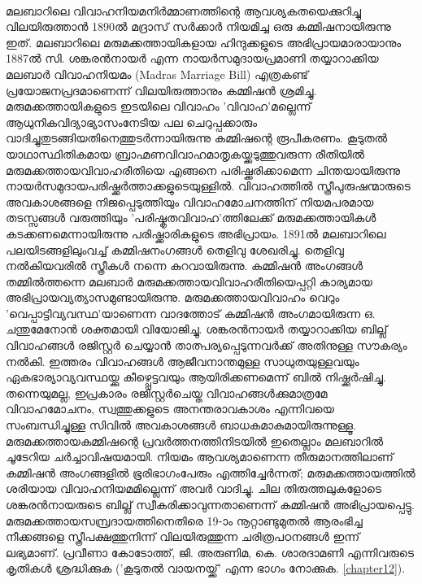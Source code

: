 \label{ch5box2} %
\begin{tcolorbox}[%
 breakable, %
  arc=0mm, 
  left=1pt, right = 1pt, 
  boxrule=0mm,
  colback = {blue!10}, %
] 

\paragraph{}മലബാറിലെ വിവാഹനിയമനിർമ്മാണത്തിന്റെ ആവശ്യകതയെക്കുറിച്ചു വിലയിരുത്താൻ 1890ൽ മദ്രാസ് സർക്കാർ നിയമിച്ച ഒരു കമ്മിഷനായിരുന്നു ഇത്. മലബാറിലെ മരുമക്കത്തായികളായ ഹിന്ദുക്കളുടെ അഭിപ്രായമാരായാനും 1887ൽ സി. ശങ്കരൻനായർ എന്ന നായർസമുദായപ്രമാണി തയ്യാറാക്കിയ മലബാർ വിവാഹനിയമം (Madras Marriage Bill) എത്രകണ്ട് പ്രയോജനപ്രദമാണെന്ന് വിലയിരുത്താനും കമ്മിഷൻ ശ്രമിച്ചു. മരുമക്കത്തായികളുടെ ഇടയിലെ വിവാഹം 'വിവാഹ'മല്ലെന്ന് ആധുനികവിദ്യാഭ്യാസംനേടിയ പല ചെറുപ്പക്കാരും വാദിച്ചുതുടങ്ങിയതിനെത്തുടർന്നായിരുന്നു കമ്മിഷന്റെ രൂപീകരണം. കൂടുതൽ യാഥാസ്ഥിതികമായ ബ്രാഹ്മണവിവാഹമാതൃകയ്ക്കടുത്തുവരുന്ന രീതിയിൽ മരുമക്കത്തായവിവാഹരീതിയെ എങ്ങനെ പരിഷ്ക്കരിക്കാമെന്ന ചിന്തയായിരുന്നു നായർസമുദായപരിഷ്ക്കർത്താക്കളുടെയുള്ളിൽ. വിവാഹത്തിൽ സ്ത്രീപുരുഷന്മാരുടെ അവകാശങ്ങളെ നിജപ്പെടുത്തിയും വിവാഹമോചനത്തിന് നിയമപരമായ തടസ്സങ്ങൾ വരുത്തിയും 'പരിഷ്കൃതവിവാഹ'ത്തിലേക്ക് മരുമക്കത്തായികൾ കടക്കണമെന്നായിരുന്നു പരിഷ്ക്കാരികളുടെ അഭിപ്രായം. 1891ൽ മലബാറിലെ പലയിടങ്ങളിലുംവച്ച് കമ്മിഷനംഗങ്ങൾ തെളിവു ശേഖരിച്ചു. തെളിവു നൽകിയവരിൽ സ്ത്രീകൾ നന്നെ കുറവായിരുന്നു. കമ്മിഷൻ അംഗങ്ങൾ തമ്മിൽത്തന്നെ മലബാർ മരുമക്കത്തായവിവാഹരീതിയെപ്പറ്റി കാര്യമായ അഭിപ്രായവ്യത്യാസമുണ്ടായിരുന്നു. മരുമക്കത്തായവിവാഹം വെറും 'വെപ്പാട്ടിവ്യവസ്ഥ'യാണെന്ന വാദത്തോട് കമ്മിഷൻ അംഗമായിരുന്ന ഒ. ചന്തുമേനോൻ ശക്തമായി വിയോജിച്ചു. ശങ്കരൻനായർ തയ്യാറാക്കിയ ബില്ല് വിവാഹങ്ങൾ രജിസ്റ്റർ ചെയ്യാൻ താത്പര്യപ്പെടുന്നവർക്ക് അതിനുള്ള സൗകര്യം നൽകി. ഇത്തരം വിവാഹങ്ങൾ ആജീവനാന്തമുള്ള സാധുതയുള്ളവയും ഏകഭാര്യാവ്യവസ്ഥയ്ക്കു കീഴ്പ്പെട്ടവയും ആയിരിക്കണമെന്ന് ബിൽ നിഷ്ക്കർഷിച്ചു. തന്നെയുമല്ല, ഇപ്രകാരം രജിസ്റ്റർചെയ്ത വിവാഹങ്ങൾക്കുമാത്രമേ വിവാഹമോചനം, സ്വത്തുക്കളുടെ അനന്തരാവകാശം എന്നിവയെ സംബന്ധിച്ചുള്ള സിവിൽ അവകാശങ്ങൾ ബാധകമാകുമായിരുന്നുള്ളൂ. മരുമക്കത്തായകമ്മിഷന്റെ പ്രവർത്തനത്തിനിടയിൽ ഇതെല്ലാം മലബാറിൽ ചൂടേറിയ ചർച്ചാവിഷയമായി. നിയമം ആവശ്യമാണെന്ന തീരുമാനത്തിലാണ് കമ്മിഷൻ അംഗങ്ങളിൽ ഭൂരിഭാഗംപേരും എത്തിച്ചേർന്നത്; മരുമക്കത്തായത്തിൽ ശരിയായ വിവാഹനിയമമില്ലെന്ന് അവർ വാദിച്ചു. ചില തിരുത്തലുകളോടെ ശങ്കരൻനായരുടെ ബില്ല് സ്വീകരിക്കാവുന്നതാണെന്ന് കമ്മിഷൻ അഭിപ്രായപ്പെട്ടു. മരുമക്കത്തായസമ്പ്രദായത്തിനെതിരെ 19-ാം നൂറ്റാണ്ടുമുതൽ ആരംഭിച്ച നീക്കങ്ങളെ സ്ത്രീപക്ഷത്തുനിന്ന് വിലയിരുത്തുന്ന ചരിത്രപഠനങ്ങൾ ഇന്ന് ലഭ്യമാണ്. പ്രവീണാ കോടോത്ത്, ജി. അരുണിമ, കെ. ശാരദാമണി എന്നിവരുടെ കൃതികൾ ശ്രദ്ധിക്കുക ('കൂടുതൽ വായനയ്ക്ക്' എന്ന ഭാഗം നോക്കുക. \ref{chapter12}).
\end{tcolorbox}

